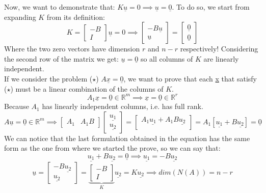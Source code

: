 Now, we want to demonstrate that: $K\underline{u} = 0 \implies \underline{u} = \underline{0}$. 
To do so, we start from expanding $K$ from its definition:
\[
    K = \begin{bmatrix}
        -B\\
        I
    \end{bmatrix}
    \underline{u} = 0
    \implies
    \begin{bmatrix}
        -B\underline{u}\\
        \underline{u}
    \end{bmatrix}
    = 
    \begin{bmatrix}
        \underline{0}\\
        \underline{0}
    \end{bmatrix}
\]
Where the two zero vectors have dimension $r$ and $n-r$ respectively! Considering the second row of the matrix we get: $\underline{u} = \underline{0}$ so all columns of $K$ are linearly independent.\\

If we consider the problem ($\star$) $A\underline{x} = \underline{0}$, we want to prove that each \underline{x} that satisfy ($\star$) must be a linear combination of the columns of $K$.\\
\[
    A_1\underline{x} = \underline{0} \in \mathbb{R}^m \implies \underline{x} = \underline{0} \in \mathbb{R}^r    
\]
Because $A_1$ has linearly independent columns, i.e. has full rank.
\[
    A\underline{u} = \underline{0} \in \mathbb{R}^m \implies \begin{bmatrix}
        A_1 & A_1B
    \end{bmatrix} 
    \begin{bmatrix}
        \underline{u_1}\\
        \underline{u_2}
    \end{bmatrix}  
    = 
    \begin{bmatrix}
        A_1\underline{u_1} + A_1B\underline{u_2}\\
    \end{bmatrix}
    = 
    A_1\left[\underline{u_1} + B\underline{u_2}\right]
    = \underline{0}
\]
We can notice that the last formulation obtained in the equation has the same form as the one from where we started the prove, so we can say that:
\[
    \underline{u_1} + B\underline{u_2} = \underline{0} \implies \underline{u_1} = -B\underline{u_2}    
\]
\[
   \underline{u} = \begin{bmatrix}
    -B\underline{u_2}\\
    \underline{u_2}
\end{bmatrix}
    =
\underbrace{\begin{bmatrix}
    -B\\
    I
\end{bmatrix}}_{K}
    \underline{u_2}
    = K\underline{u_2}
    \implies 
    dim(N(A)) = n - r
\]
